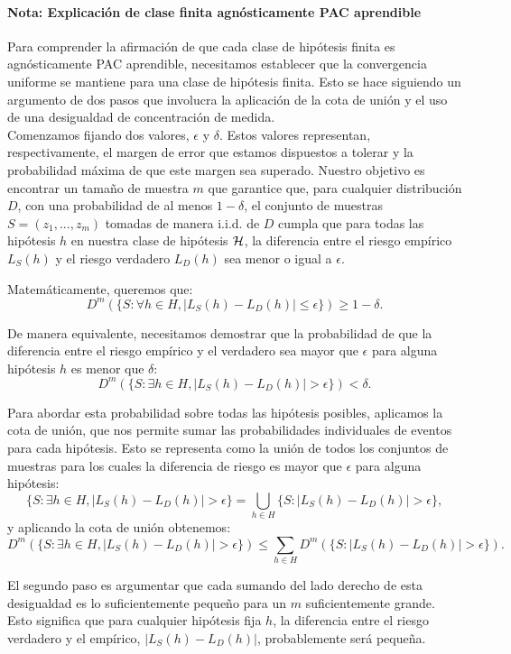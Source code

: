 \paragraph{Nota: Explicación de clase finita agnósticamente PAC aprendible}
Para comprender la afirmación de que cada clase de hipótesis finita es agnósticamente PAC aprendible, necesitamos establecer que la convergencia uniforme se mantiene para una clase de hipótesis finita. Esto se hace siguiendo un argumento de dos pasos que involucra la aplicación de la cota de unión y el uso de una desigualdad de concentración de medida.\\

Comenzamos fijando dos valores, $ \epsilon $ y $ \delta $. Estos valores representan, respectivamente, el margen de error que estamos dispuestos a tolerar y la probabilidad máxima de que este margen sea superado. Nuestro objetivo es encontrar un tamaño de muestra $ m $ que garantice que, para cualquier distribución $ D $, con una probabilidad de al menos $ 1 - \delta $, el conjunto de muestras $S = (z_1, ..., z_m) $ tomadas de manera i.i.d. de $D$ cumpla que para todas las hipótesis $ h$ en nuestra clase de hipótesis $ \mathop{\mbox{$\mathcal{H}$}}\nolimits$, la diferencia entre el riesgo empírico $ L_S(h) $ y el riesgo verdadero $ L_D(h) $ sea menor o igual a $ \epsilon $.

Matemáticamente, queremos que:
$$
D^m(\{S : \forall h \in H, |L_S(h) - L_D(h)| \leq \epsilon\}) \geq 1 - \delta.
$$

De manera equivalente, necesitamos demostrar que la probabilidad de que la diferencia entre el riesgo empírico y el verdadero sea mayor que $\epsilon$ para alguna hipótesis $h $ es menor que $ \delta $:
$$
D^m(\{S : \exists h \in H, |L_S(h) - L_D(h)| > \epsilon\}) < \delta.
$$

Para abordar esta probabilidad sobre todas las hipótesis posibles, aplicamos la cota de unión, que nos permite sumar las probabilidades individuales de eventos para cada hipótesis. Esto se representa como la unión de todos los conjuntos de muestras para los cuales la diferencia de riesgo es mayor que $\epsilon$ para alguna hipótesis:
$$
\{S : \exists h \in H, |L_S(h) - L_D(h)| > \epsilon\} = \bigcup_{h \in H} \{S : |L_S(h) - L_D(h)| > \epsilon\},
$$
y aplicando la cota de unión obtenemos:
$$
D^m(\{S : \exists h \in H, |L_S(h) - L_D(h)| > \epsilon\}) \leq \sum_{h \in H} D^m(\{S : |L_S(h) - L_D(h)| > \epsilon\}).
$$

El segundo paso es argumentar que cada sumando del lado derecho de esta desigualdad es lo suficientemente pequeño para un $m$ suficientemente grande. Esto significa que para cualquier hipótesis fija $h$, la diferencia entre el riesgo verdadero y el empírico, $|L_S(h) - L_D(h)|$, probablemente será pequeña.\\

